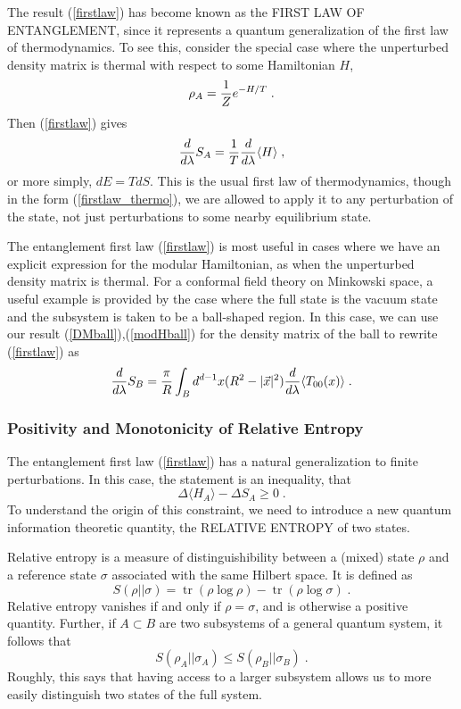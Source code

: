 \documentclass[12pt,epsf]{article}
\newcommand{\be}{\begin{equation}}
\newcommand{\ee}{\end{equation}}
\newcommand{\tr}{\operatorname{tr}}
\begin{document}
The result (\ref{firstlaw}) has become known as the FIRST LAW OF ENTANGLEMENT, since it represents a quantum generalization of the first law of thermodynamics. To see this, consider the special case where the unperturbed density matrix is thermal with respect to some Hamiltonian $H$,
\be
\rho_A = {1 \over Z} e^{-H/T} \; .
\ee
Then (\ref{firstlaw}) gives
\be
\label{firstlaw_thermo}
{d \over d \lambda} S_A = {1 \over T} {d \over d \lambda} \langle H \rangle \; ,
\ee
or more simply, $dE = T dS$. This is the usual first law of thermodynamics, though in the form (\ref{firstlaw_thermo}), we are allowed to apply it to any perturbation of the state, not just perturbations to some nearby equilibrium state.

The entanglement first law (\ref{firstlaw}) is most useful in cases where we have an explicit expression for the modular Hamiltonian, as when the unperturbed density matrix is thermal. For a conformal field theory on Minkowski space, a useful example is provided by the case where the full state is the vacuum state and the subsystem is taken to be a ball-shaped region. In this case, we can use our result (\ref{DMball}),(\ref{modHball}) for the density matrix of the ball to rewrite (\ref{firstlaw}) as \cite{blanco2013relative}
\be
\label{firstlaw_CFT}
{d \over d \lambda} S_B = {\pi \over R} \int_B d^{d-1} x (R^2 - |\vec{x}|^2) {d \over d \lambda} \langle T_{00}(x) \rangle \; .
\ee

\subsubsection*{Positivity and Monotonicity of Relative Entropy}

The entanglement first law (\ref{firstlaw}) has a natural generalization to finite perturbations. In this case, the statement is an inequality, that
\be
\label{RE1}
 \Delta \langle H_A \rangle - \Delta S_A \ge 0 \; .
\ee
To understand the origin of this constraint, we need to introduce a new quantum information theoretic quantity, the RELATIVE ENTROPY of two states.

Relative entropy is a measure of distinguishibility between a (mixed) state $\rho$ and a reference state $\sigma$ associated with the same Hilbert space. It is defined as
\be
\label{REdef}
S(\rho || \sigma) = \tr(\rho \log \rho) - \tr(\rho \log \sigma) \; .
\ee
Relative entropy vanishes if and only if $\rho = \sigma$, and is otherwise a positive quantity. Further, if $A \subset B$ are two subsystems of a general quantum system, it follows that
\be
S(\rho_A || \sigma_A) \le S(\rho_B || \sigma_B) \; .
\ee
Roughly, this says that having access to a larger subsystem allows us to more easily distinguish two states of the full system.
\end{document}
